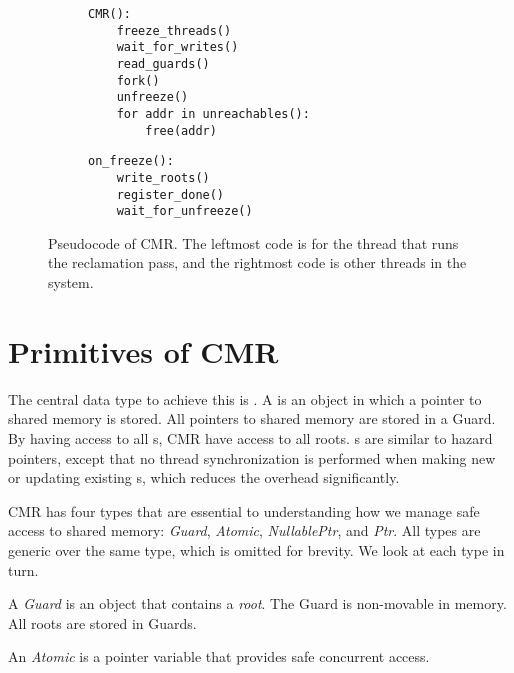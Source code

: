 \begin{figure}[ht]
  \begin{subfigure}{0.45\textwidth}
    \begin{lstlisting}
CMR():
    freeze_threads()
    wait_for_writes()
    read_guards()
    fork()
    unfreeze()
    for addr in unreachables():
        free(addr)
    \end{lstlisting}
  \end{subfigure}
  \hfill
  \begin{subfigure}{0.45\textwidth}
    \begin{lstlisting}
on_freeze():
    write_roots()
    register_done()
    wait_for_unfreeze()
    \end{lstlisting}
  \end{subfigure}
  \caption{Pseudocode of CMR\@. The leftmost code is for the thread that runs the reclamation pass,
  and the rightmost code is other threads in the system.\label{lst:cmr}}
\end{figure}



\section{Primitives of CMR\label{sec:cmr-primitives}}

The central data type to achieve this is . A  is an object in which a
pointer to shared memory is stored. All pointers to shared memory are stored in a Guard. By
having access to all s, CMR have access to all roots. s are similar to
hazard pointers, except that no thread synchronization is performed when making new or updating
existing s, which reduces the overhead significantly.

CMR has four types that are essential to understanding how we manage safe access to shared memory:
\emph{Guard}, \emph{Atomic}, \emph{NullablePtr}, and \emph{Ptr}. All types are generic over the
same type, which is omitted for brevity. We look at each type in turn.

\begin{definition}[Guard]
  A \emph{Guard} is an object that contains a \emph{root}. The Guard is non-movable in memory.
  All roots are stored in Guards.
\end{definition}

\begin{definition}[Atomic]
  An \emph{Atomic} is a pointer variable that provides safe concurrent access.
\end{definition}


